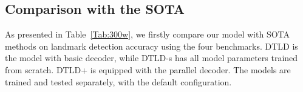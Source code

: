 \begin{table*}[htbp]
    \newcommand{\tabincell}[2]{\begin{tabular}{@{}#1@{}}#2\end{tabular}}
    \begin{center}
        \setlength{\tabcolsep}{4mm}
    \end{center}
\vspace{-5mm}
\caption{Comparison with other methods on Parameter size, GFLOPs and FPS. Our method achieves the highest accuracy with a small amount of GFLOPs and parameters. The FPS is lower than PIPNet-18, which leaves for future improving.}
\label{Tab:speed}
\vspace{-2mm}
\end{table*}



\subsection{Comparison with the SOTA}

As presented in Table~\ref{Tab:300w}, we firstly compare our model with SOTA methods on landmark detection accuracy using the four benchmarks. DTLD is the model with basic decoder, while DTLD-s has all model parameters trained from scratch. DTLD+ is equipped with the parallel decoder.
The models are trained and tested separately, with the default configuration.

